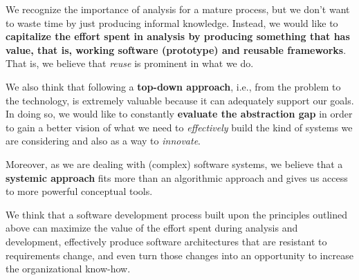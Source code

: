 \documentclass{article}
\begin{document}
We recognize the importance of analysis for a mature process, but we don't want
to waste time by just producing informal knowledge. Instead, we would like to \textbf{capitalize the
effort spent in analysis by producing something that has value, that is, working software (prototype) and reusable frameworks}.
That is, we believe that \emph{reuse} is prominent in what we do.

We also think that following a \textbf{top-down approach}, i.e., from the
problem to the technology, is extremely valuable because it can adequately
support our goals. In doing so, we would like to constantly \textbf{evaluate the
abstraction gap} in order to gain a better vision of what we need to
\emph{effectively} build the kind of systems we are considering and also as a
way to \emph{innovate}.

Moreover, as we are dealing with (complex) software systems, we believe
that a \textbf{systemic approach} fits more than an algorithmic approach and 
gives us access to more powerful conceptual tools.

We think that a software development process built upon the
principles outlined above can maximize the value of the effort spent
during analysis and development, effectively produce software architectures that
are resistant to requirements change, and even turn those changes into an
opportunity to increase the organizational know-how.\\
\end{document}
